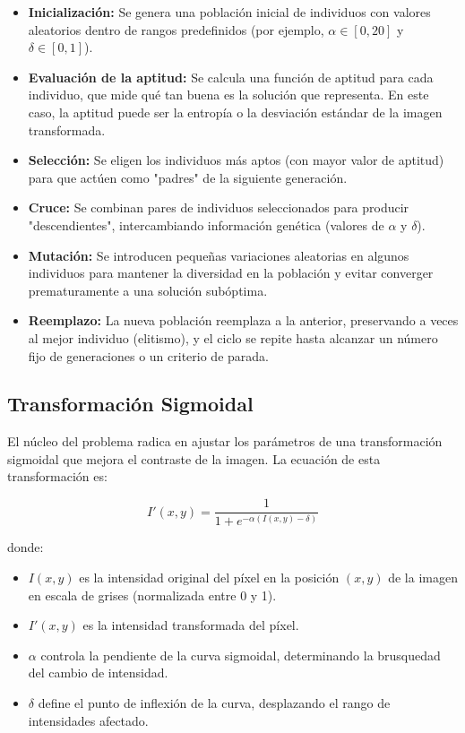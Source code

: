 \begin{itemize}
    \item \textbf{Inicialización:} Se genera una población inicial de individuos con valores aleatorios dentro de rangos predefinidos (por ejemplo, \(\alpha \in [0, 20]\) y \(\delta \in [0, 1]\)).
    \item \textbf{Evaluación de la aptitud:} Se calcula una función de aptitud para cada individuo, que mide qué tan buena es la solución que representa. En este caso, la aptitud puede ser la entropía o la desviación estándar de la imagen transformada.
    \item \textbf{Selección:} Se eligen los individuos más aptos (con mayor valor de aptitud) para que actúen como "padres" de la siguiente generación.
    \item \textbf{Cruce:} Se combinan pares de individuos seleccionados para producir "descendientes", intercambiando información genética (valores de \(\alpha\) y \(\delta\)).
    \item \textbf{Mutación:} Se introducen pequeñas variaciones aleatorias en algunos individuos para mantener la diversidad en la población y evitar converger prematuramente a una solución subóptima.
    \item \textbf{Reemplazo:} La nueva población reemplaza a la anterior, preservando a veces al mejor individuo (elitismo), y el ciclo se repite hasta alcanzar un número fijo de generaciones o un criterio de parada.
\end{itemize}

\subsection{Transformación Sigmoidal}
El núcleo del problema radica en ajustar los parámetros de una transformación sigmoidal que mejora el contraste de la imagen. La ecuación de esta transformación es:

\begin{equation}
I'(x, y) = \frac{1}{1 + e^{-\alpha (I(x, y) - \delta)}}
\label{eq:sigmoid_transform}
\end{equation}

donde:

\begin{itemize}
    \item \(I(x, y)\) es la intensidad original del píxel en la posición \((x, y)\) de la imagen en escala de grises (normalizada entre 0 y 1).
    \item \(I'(x, y)\) es la intensidad transformada del píxel.
    \item \(\alpha\) controla la pendiente de la curva sigmoidal, determinando la brusquedad del cambio de intensidad.
    \item \(\delta\) define el punto de inflexión de la curva, desplazando el rango de intensidades afectado.
\end{itemize}

